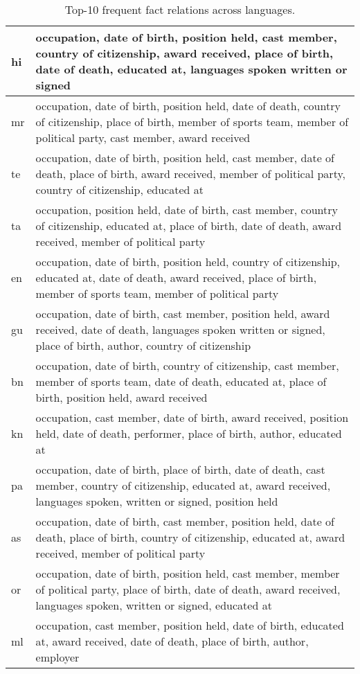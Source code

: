 \documentclass[runningheads]{llncs}
\begin{document}
\begin{table*}
    \centering
    \scriptsize
    \begin{tabular}{|l|p{}|}
    \hline
hi&occupation, date of birth, position held, cast member, country of citizenship, award received, place of birth, date of death, educated at, languages spoken written or signed\\
\hline
mr&occupation, date of birth, position held, date of death, country of citizenship, place of birth, member of sports team, member of political party, cast member, award received\\
\hline
te&occupation, date of birth, position held, cast member, date of death, place of birth, award received, member of political party, country of citizenship, educated at\\
\hline
ta&occupation, position held, date of birth, cast member, country of citizenship, educated at, place of birth, date of death, award received, member of political party\\
\hline
en&occupation, date of birth, position held, country of citizenship, educated at, date of death, award received, place of birth, member of sports team, member of political party\\
\hline
gu&occupation, date of birth, cast member, position held, award received, date of death, languages spoken written or signed, place of birth, author, country of citizenship\\
\hline
bn&occupation, date of birth, country of citizenship, cast member, member of sports team, date of death, educated at, place of birth, position held, award received\\
\hline
kn&occupation, cast member, date of birth, award received, position held, date of death, performer, place of birth, author, educated at\\
\hline
pa&occupation, date of birth, place of birth, date of death, cast member, country of citizenship, educated at, award received, languages spoken, written or signed, position held\\
\hline
as&occupation, date of birth, cast member, position held, date of death, place of birth, country of citizenship, educated at, award received, member of political party\\
\hline
or&occupation, date of birth, position held, cast member, member of political party, place of birth, date of death, award received, languages spoken, written or signed, educated at\\
\hline
ml&occupation, cast member, position held, date of birth, educated at, award received, date of death, place of birth, author, employer\\
\hline
    \end{tabular}
    \caption{Top-10 frequent fact relations across languages.}
    \label{tab:topkpredicates}
\end{table*}
\end{document}
